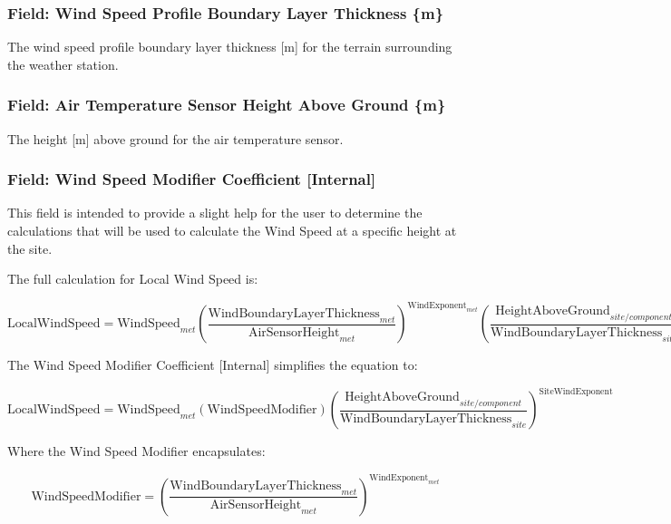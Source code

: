 \subsubsection{Field: Wind Speed Profile Boundary Layer Thickness \{m\}}\label{field-wind-speed-profile-boundary-layer-thickness-m}

The wind speed profile boundary layer thickness {[}m{]} for the terrain surrounding the weather station.

\subsubsection{Field: Air Temperature Sensor Height Above Ground \{m\}}\label{field-air-temperature-sensor-height-above-ground-m}

The height {[}m{]} above ground for the air temperature sensor.

\subsubsection{Field: Wind Speed Modifier Coefficient {[}Internal{]}}\label{field-wind-speed-modifier-coefficient-internal}

This field is intended to provide a slight help for the user to determine the calculations that will be used to calculate the Wind Speed at a specific height at the site.

The full calculation for Local Wind Speed is:

\begin{equation}
\text{LocalWindSpeed} = \text{WindSpeed}_{met} \left( \frac{\text{WindBoundaryLayerThickness}_{met}}{\text{AirSensorHeight}_{met}} \right)^{\text{WindExponent}_{met}} \left(\frac{\text{HeightAboveGround}_{site/component}}{\text{WindBoundaryLayerThickness}_{site}}\right)^{\text{SiteWindExponent}}
\end{equation}

The Wind Speed Modifier Coefficient {[}Internal{]} simplifies the equation to:

\begin{equation}
\text{LocalWindSpeed} = \text{WindSpeed}_{met} \left( \text{WindSpeedModifier} \right) \left(\frac{\text{HeightAboveGround}_{site/component}}{\text{WindBoundaryLayerThickness}_{site}}\right)^{\text{SiteWindExponent}}
\end{equation}

Where the Wind Speed Modifier encapsulates:

\begin{equation}
\text{WindSpeedModifier} = \left( \frac{\text{WindBoundaryLayerThickness}_{met}}{\text{AirSensorHeight}_{met}} \right)^{\text{WindExponent}_{met}}
\end{equation}

